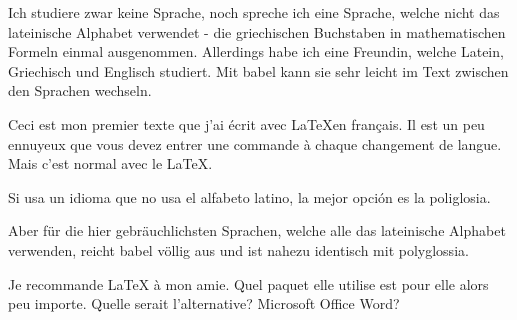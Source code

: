 \documentclass{scrartcl}
\begin{document}
Ich studiere zwar keine Sprache, noch spreche ich eine Sprache, welche nicht das lateinische Alphabet verwendet - die griechischen Buchstaben in mathematischen Formeln einmal ausgenommen. Allerdings habe ich eine Freundin, welche Latein, Griechisch und Englisch studiert. Mit babel kann sie sehr leicht im Text zwischen den Sprachen wechseln.

Ceci est mon premier texte que j'ai écrit avec \LaTeX  en français. Il est un peu ennuyeux que vous devez entrer une commande à chaque changement de langue. Mais c'est normal avec le \LaTeX.

Si usa un idioma que no usa el alfabeto latino, la mejor opción es la poliglosia.

Aber für die hier gebräuchlichsten Sprachen, welche alle das lateinische Alphabet verwenden, reicht babel völlig aus und ist nahezu identisch mit polyglossia.

Je recommande LaTeX à mon amie. Quel paquet elle utilise est pour elle alors peu importe. Quelle serait l'alternative? Microsoft Office Word?
\end{document}
